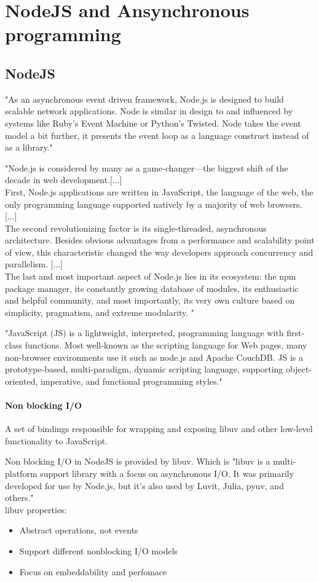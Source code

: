 \section{NodeJS and Ansynchronous programming}
\subsection{NodeJS}

"As an asynchronous event driven framework, Node.js is designed to build scalable network applications. 
Node is similar in design to and influenced by systems like Ruby's Event Machine or Python's Twisted. 
Node takes the event model a bit further, it presents the event loop as a language construct instead of as a library." \cite{nodejsabout}

"Node.js is considered by many as a game-changer—the biggest shift of the decade in web development.[...]\\
 First, Node.js applications are written in JavaScript, the language of the web, the only programming language supported natively by a majority of web browsers. [...]\\
The second revolutionizing factor is its single-threaded, asynchronous architecture. 
Besides obvious advantages from a performance and scalability point of view, this characteristic changed the way developers approach concurrency and parallelism. [...]\\
The last and most important aspect of Node.js lies in its ecosystem: the npm package manager, its constantly growing database of modules, its enthusiastic and helpful community, and most importantly, its very own culture based on simplicity, pragmatism, and extreme modularity. "\cite{nodejsbook}

"JavaScript (JS) is a lightweight, interpreted, programming language with first-class functions. Most well-known as the scripting language for Web pages, many non-browser environments use it such as node.js and Apache CouchDB. JS is a prototype-based, multi-paradigm, dynamic scripting language, supporting object-oriented, imperative, and functional programming styles."\cite{mozillaJS}

\paragraph{Non blocking I/O}
A set of bindings responsible for wrapping and exposing libuv and other low-level functionality to JavaScript.\cite{nodejsbook}

Non blocking I/O in NodeJS is provided by libuv\cite{nodejsabout}\cite{nodejsbook}. 
Which is "libuv is a multi-platform support library with a focus on asynchronous I/O. It was primarily developed for use by Node.js, but it’s also used by Luvit, Julia, pyuv, and others."\cite{libuv}\\
libuv properties\cite{libuvBasic}:
\begin{itemize}
\item Abstract operations, not events
\item Support different nonblocking I/O models
\item Focus on embeddability and perfomace
\end{itemize}


